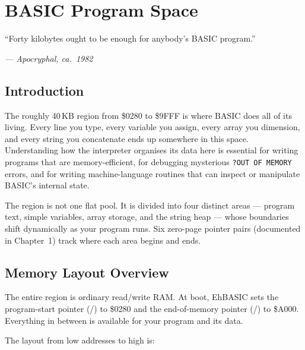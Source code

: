 \chapter{BASIC Program Space}

\epigraph{``Forty kilobytes ought to be enough for anybody's BASIC
program.''}{\textit{--- Apocryphal, ca.\ 1982}}

\section*{Introduction}

The roughly 40\,KB region from \$0280 to \$9FFF is where BASIC does all of its
living.  Every line you type, every variable you assign, every array you
dimension, and every string you concatenate ends up somewhere in this space.
Understanding how the interpreter organises its data here is essential for
writing programs that are memory-efficient, for debugging mysterious
\texttt{?OUT OF MEMORY} errors, and for writing machine-language routines that
can inspect or manipulate BASIC's internal state.

The region is not one flat pool.  It is divided into four distinct areas ---
program text, simple variables, array storage, and the string heap --- whose
boundaries shift dynamically as your program runs.  Six zero-page pointer
pairs (documented in Chapter~1) track where each area begins and ends.

\section{Memory Layout Overview}


The entire region is ordinary read/write RAM.  At boot, EhBASIC sets the
program-start pointer (/) to \$0280 and the
end-of-memory pointer (/) to \$A000.  Everything in
between is available for your program and its data.

The layout from low addresses to high is:

